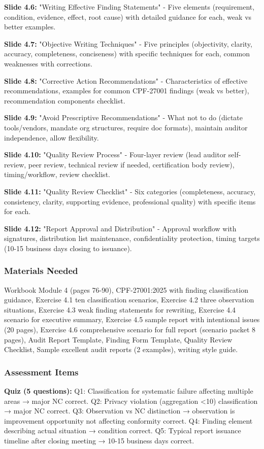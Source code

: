 \documentclass[11pt,a4paper]{article}
\begin{document}
\textbf{Slide 4.6:} "Writing Effective Finding Statements" - Five elements (requirement, condition, evidence, effect, root cause) with detailed guidance for each, weak vs better examples.

\textbf{Slide 4.7:} "Objective Writing Techniques" - Five principles (objectivity, clarity, accuracy, completeness, conciseness) with specific techniques for each, common weaknesses with corrections.

\textbf{Slide 4.8:} "Corrective Action Recommendations" - Characteristics of effective recommendations, examples for common CPF-27001 findings (weak vs better), recommendation components checklist.

\textbf{Slide 4.9:} "Avoid Prescriptive Recommendations" - What not to do (dictate tools/vendors, mandate org structures, require doc formats), maintain auditor independence, allow flexibility.

\textbf{Slide 4.10:} "Quality Review Process" - Four-layer review (lead auditor self-review, peer review, technical review if needed, certification body review), timing/workflow, review checklist.

\textbf{Slide 4.11:} "Quality Review Checklist" - Six categories (completeness, accuracy, consistency, clarity, supporting evidence, professional quality) with specific items for each.

\textbf{Slide 4.12:} "Report Approval and Distribution" - Approval workflow with signatures, distribution list maintenance, confidentiality protection, timing targets (10-15 business days closing to issuance).

\subsubsection{Materials Needed}
Workbook Module 4 (pages 76-90), CPF-27001:2025 with finding classification guidance, Exercise 4.1 ten classification scenarios, Exercise 4.2 three observation situations, Exercise 4.3 weak finding statements for rewriting, Exercise 4.4 scenario for executive summary, Exercise 4.5 sample report with intentional issues (20 pages), Exercise 4.6 comprehensive scenario for full report (scenario packet 8 pages), Audit Report Template, Finding Form Template, Quality Review Checklist, Sample excellent audit reports (2 examples), writing style guide.

\subsubsection{Assessment Items}
\textbf{Quiz (5 questions):} Q1: Classification for systematic failure affecting multiple areas → major NC correct. Q2: Privacy violation (aggregation <10) classification → major NC correct. Q3: Observation vs NC distinction → observation is improvement opportunity not affecting conformity correct. Q4: Finding element describing actual situation → condition correct. Q5: Typical report issuance timeline after closing meeting → 10-15 business days correct.
\end{document}
